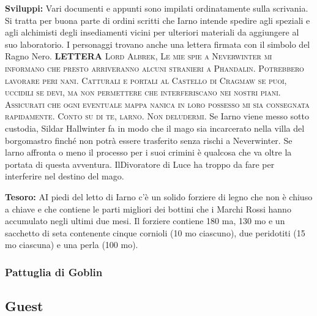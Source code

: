 \documentclass{article}
\begin{document}
\textbf{Sviluppi:}
Vari documenti e appunti sono impilati ordinatamente sulla
scrivania. Si tratta per buona parte di ordini scritti che
Iarno intende spedire agli speziali e agli alchimisti degli
insediamenti vicini per ulteriori materiali da aggiungere
al suo laboratorio. I personaggi trovano anche una lettera
firmata con il simbolo del Ragno Nero. \textbf{LETTERA} \textsc{Lord Albrek,
Le mie spie a Neverwinter mi informano che presto
arriveranno alcuni stranieri a Phandalin. Potrebbero lavorare
peri nani. Catturali e portali al Castello di Cragmaw se puoi, uccidili se devi, ma non
permettere che interferiscano nei nostri piani. Assicurati
che ogni eventuale mappa nanica in loro possesso mi sia
consegnata rapidamente.
Conto su di te, larno. Non deludermi.}
Se Iarno viene messo sotto custodia, Sildar Hallwinter fa in
modo che il mago sia incarcerato nella villa del borgomastro
finché non potrà essere trasferito senza rischi a Neverwinter.
Se larno affronta o meno il processo per i suoi crimini è
qualcosa che va oltre la portata di questa avventura. IlDivoratore di Luce ha troppo da fare per interferire nel destino del mago.

\textbf{Tesoro:}
AI piedi del letto di Iarno c'è un solido forziere di legno che
non è chiuso a chiave e che contiene le parti migliori dei
bottini che i Marchi Rossi hanno accumulato negli ultimi
due mesi. Il forziere contiene 180 ma, 130 mo e un sacchetto
di seta contenente cinque cornioli (10 mo ciascuno), due
peridotiti (15 mo ciascuna) e una perla (100 mo). 

\subsubsection{Pattuglia di Goblin}

 

\subsection{Guest}
\end{document}
